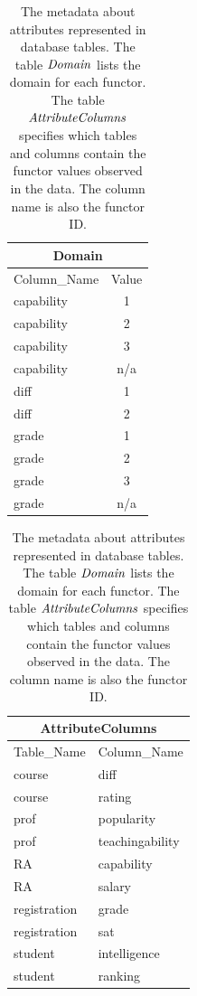 \begin{table}[htbp]
  \centering
  \caption{  The metadata about attributes represented in \RVD database tables.  The table $\it{Domain}$ lists the domain for each functor. The table $\it{AttributeColumns}$ specifies which tables and columns contain the functor values observed in the data. The column name is also the functor ID.}
    \begin{tabular}{|l|c|}
    \multicolumn{2}{c}{\textbf{Domain}} \\ \hline
    Column\_Name & \multicolumn{1}{l|}{Value} \\ \hline
    capability & 1 \\ \hline
    capability & 2 \\ \hline
    capability & 3 \\ \hline
    capability & n/a \\ \hline
    diff  & 1 \\ \hline
    diff  & 2 \\ \hline
    grade & 1 \\ \hline
    grade & 2 \\ \hline
    grade & 3 \\ \hline
    grade & n/a \\ \hline
    \end{tabular} 
    
     \begin{tabular}{|l|l|}
    \multicolumn{2}{c}{\textbf{AttributeColumns}} \\ \hline
    Table\_Name & Column\_Name \\ \hline
    course & diff \\ \hline
    course & rating \\ \hline
    prof  & popularity \\ \hline
    prof  & teachingability \\ \hline
    RA    & capability \\ \hline
    RA    & salary \\ \hline
    registration & grade \\ \hline
    registration & sat \\ \hline
    student & intelligence \\ \hline
    student & ranking \\ \hline
    \end{tabular}%

  \label{tab:attributes}%
\end{table}%

